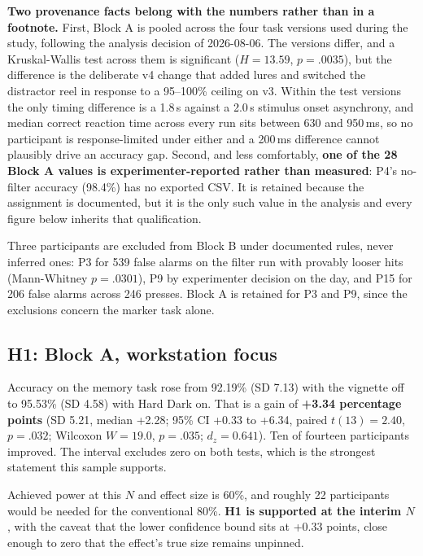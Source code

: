 \textbf{Two provenance facts belong with the numbers rather than in a footnote.} First, Block A is
pooled across the four task versions used during the study, following the analysis decision of
2026-08-06. The versions differ, and a Kruskal-Wallis test across them is significant
($H = 13.59$, $p = .0035$), but the difference is the deliberate v4 change that added lures and
switched the distractor reel in response to a 95--100\% ceiling on v3. Within the test versions the
only timing difference is a 1.8\,s against a 2.0\,s stimulus onset asynchrony, and median correct
reaction time across every run sits between 630 and 950\,ms, so no participant is response-limited
under either and a 200\,ms difference cannot plausibly drive an accuracy gap. Second, and less
comfortably, \textbf{one of the 28 Block A values is experimenter-reported rather than measured}:
P4's no-filter accuracy (98.4\%) has no exported CSV. It is retained because the assignment is
documented, but it is the only such value in the analysis and every figure below inherits that
qualification.

Three participants are excluded from Block B under documented rules, never inferred ones: P3 for 539
false alarms on the filter run with provably looser hits (Mann-Whitney $p = .0301$), P9 by
experimenter decision on the day, and P15 for 206 false alarms across 246 presses. Block A is
retained for P3 and P9, since the exclusions concern the marker task alone.

\subsection{H1: Block A, workstation focus}

Accuracy on the memory task rose from 92.19\% (SD 7.13) with the vignette off to 95.53\% (SD 4.58)
with Hard Dark on. That is a gain of \textbf{+3.34 percentage points} (SD 5.21, median +2.28; 95\% CI
+0.33 to +6.34, paired $t(13) = 2.40$, $p = .032$; Wilcoxon $W = 19.0$, $p = .035$; $d_z = 0.641$).
Ten of fourteen participants improved. The interval excludes zero on both tests, which is the
strongest statement this sample supports.

Achieved power at this $N$ and effect size is 60\%, and roughly 22 participants would be needed for
the conventional 80\%. \textbf{H1 is supported at the interim $N$}, with the caveat that the lower
confidence bound sits at +0.33 points, close enough to zero that the effect's true size remains
unpinned.


